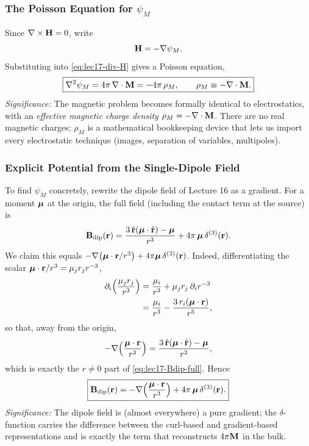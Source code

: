 \subsubsection*{The Poisson Equation for $\psi_M$}
Since $\nabla\times\mathbf{H}=0$, write
\begin{equation}\label{eq:lec17-H-grad}
  \mathbf{H}=-\nabla\psi_M.
\end{equation}
Substituting into \eqref{eq:lec17-div-H} gives a Poisson equation,
\begin{equation}\label{eq:lec17-poisson-psi}
  \boxed{\nabla^2\psi_M=4\pi\,\nabla\cdot\mathbf{M}=-4\pi\,\rho_M,
  \qquad
  \rho_M\equiv-\nabla\cdot\mathbf{M}.}
\end{equation}
\textit{Significance:} The magnetic problem becomes formally identical to electrostatics,
with an \emph{effective magnetic charge density} $\rho_M=-\nabla\cdot\mathbf{M}$.  There are
no real magnetic charges; $\rho_M$ is a mathematical bookkeeping device that lets us
import every electrostatic technique (images, separation of variables, multipoles).

\subsubsection*{Explicit Potential from the Single-Dipole Field}
To find $\psi_M$ concretely, rewrite the dipole field of Lecture 16 as a gradient.  For
a moment $\boldsymbol{\mu}$ at the origin, the full field (including the contact term at the source)
is
\begin{equation}\label{eq:lec17-Bdip-full}
  \mathbf{B}_{\rm dip}(\mathbf{r})
  =\frac{3\,\hat{\mathbf{r}}(\boldsymbol{\mu}\cdot\hat{\mathbf{r}})-\boldsymbol{\mu}}{r^3}
  +4\pi\,\boldsymbol{\mu}\,\delta^{(3)}(\mathbf{r}).
\end{equation}
We claim this equals $-\nabla\bigl(\boldsymbol{\mu}\cdot\mathbf{r}/r^3\bigr)+4\pi\boldsymbol{\mu}\,\delta^{(3)}(\mathbf{r})$.
Indeed, differentiating the scalar $\boldsymbol{\mu}\cdot\mathbf{r}/r^3=\mu_j r_j r^{-3}$,
\begin{align}
  \partial_i\!\left(\frac{\mu_j r_j}{r^3}\right)
  &=\frac{\mu_i}{r^3}+\mu_j r_j\,\partial_i r^{-3} \notag\\
  &=\frac{\mu_i}{r^3}-\frac{3\,r_i(\boldsymbol{\mu}\cdot\mathbf{r})}{r^5},
  \label{eq:lec17-grad-mur}
\end{align}
so that, away from the origin,
\begin{equation}\label{eq:lec17-grad-equals-field}
  -\nabla\!\left(\frac{\boldsymbol{\mu}\cdot\mathbf{r}}{r^3}\right)
  =\frac{3\,\hat{\mathbf{r}}(\boldsymbol{\mu}\cdot\hat{\mathbf{r}})-\boldsymbol{\mu}}{r^3},
\end{equation}
which is exactly the $r\neq0$ part of \eqref{eq:lec17-Bdip-full}.  Hence
\begin{equation}\label{eq:lec17-Bdip-gradient}
  \boxed{\mathbf{B}_{\rm dip}(\mathbf{r})
  =-\nabla\!\left(\frac{\boldsymbol{\mu}\cdot\mathbf{r}}{r^3}\right)+4\pi\,\boldsymbol{\mu}\,\delta^{(3)}(\mathbf{r}).}
\end{equation}
\textit{Significance:} The dipole field is (almost everywhere) a pure gradient; the
$\delta$-function carries the difference between the curl-based and gradient-based
representations and is exactly the term that reconstructs $4\pi\mathbf{M}$ in the bulk.

